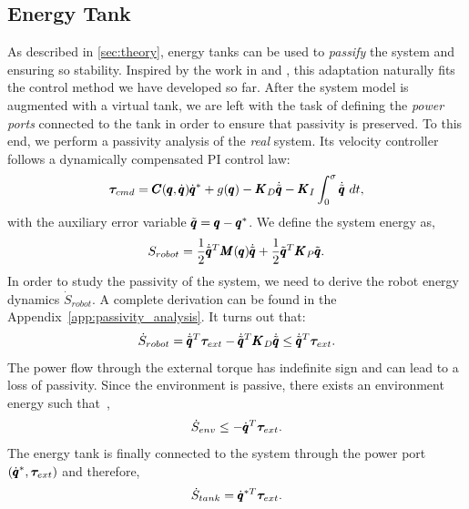 \subsection{Energy Tank}
As described in \sect \ref{sec:theory}, energy tanks can be used to \emph{passify} the system and ensuring so stability. Inspired by the work in \cite{benzi2021optimization} and \cite{shahriari2018valve}, this adaptation naturally fits the control method we have developed so far. After the system model is augmented with a virtual tank, we are left with the task of defining the \emph{power ports} connected to the tank in order to ensure that passivity is preserved. To this end, we perform a passivity analysis of the \emph{real} system. Its 
velocity controller follows a dynamically compensated PI control law:
\begin{equation}
\commandTorque = \coriolis \dconfigRobotDesired + g(\configRobot) - \matr{K}_D \dconfigRobotError - \matr{K}_I \int_{0}^{\sigma} \dconfigRobotError\ dt,
\end{equation}
with the auxiliary error variable $\tilde{\pmb{q}} =  \pmb{q} - \pmb{q}^*$. We define the system energy as, 
\begin{equation}
    S_{robot} = \frac{1}{2} \dot{\tilde{\pmb{q}}}^T \pmb{M}(\pmb{q}) \dot{\tilde{\pmb{q}}} + \frac{1}{2} \tilde{\pmb{q}}^T \pmb{K}_P \tilde{\pmb{q}}.
\end{equation}
In order to study the passivity of the system, we need to derive the robot energy dynamics $\dot{S}_{robot}$. A complete derivation can be found in the Appendix~\ref{app:passivity_analysis}. It turns out that:
\begin{equation}
    \dot{S}_{robot} = \dot{\tilde{\pmb{q}}}^T \boldsymbol{\tau}_{ext} - \dot{\tilde{\pmb{q}}}^T \pmb{K}_D \dot{\tilde{\pmb{q}}} \leq \dot{\tilde{\pmb{q}}}^T \boldsymbol{\tau}_{ext}. 
\end{equation}
The power flow through the external torque has indefinite sign and can lead to a loss of passivity. Since the environment is passive, there exists an environment energy such that~\cite{shahriari2018valve},
\begin{equation}
    \dot{S}_{env} \leq -\dot{\pmb{q}}^T \boldsymbol{\tau}_{ext}.
\end{equation}
The energy tank is finally connected to the system through the power port $(\dot{\pmb{q}}^*, \boldsymbol{\tau}_{ext})$ and therefore,
\begin{equation} \label{eq:tank_dynamics}
\dot{S}_{tank} = \dot{\pmb{q}}^{*T} \boldsymbol{\tau}_{ext}. 
\end{equation}
